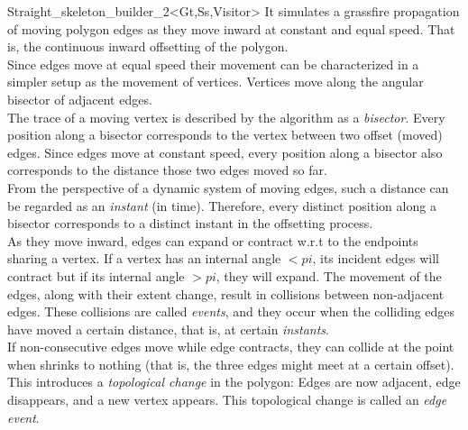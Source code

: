 \begin{ccRefClass}{Straight_skeleton_builder_2<Gt,Ss,Visitor>}
It simulates  a grassfire propagation of moving polygon edges as they move inward at constant
and equal speed. That is, the continuous inward offsetting of the polygon.\\
Since edges move at equal speed their movement can be characterized in a simpler setup as the movement of vertices. Vertices move along the angular bisector of adjacent edges.\\
The trace of a moving vertex is described by the algorithm as a {\em bisector}. 
Every position along a bisector corresponds to the vertex between two offset (moved) edges. Since edges move at constant speed, every position along a bisector also corresponds to the distance those two edges moved so far.\\
From the perspective of a dynamic system of moving edges, such a distance can be regarded as an 
{\em instant} (in time). Therefore, every distinct position along a bisector corresponds to a distinct instant in the offsetting process.\\
As they move inward, edges can expand or contract w.r.t to the endpoints sharing a vertex. If a vertex has an internal angle $<pi$, its incident edges will contract but if its internal angle $>pi$, they will expand. The movement of the edges, along with their extent change, result in collisions between non-adjacent edges. These collisions are called {\em events}, and they occur when the colliding edges have moved a certain distance, that is, at certain \textit{instants}.\\
If non-consecutive edges  move while edge  contracts, they can collide at the point when  shrinks to nothing (that is, the three edges might meet at a certain offset). This introduces a \textit{topological change} in the polygon: Edges  are now adjacent, edge  disappears, and a new vertex appears. This topological change is called an {\em edge event}.\\

\end{ccRefClass}
